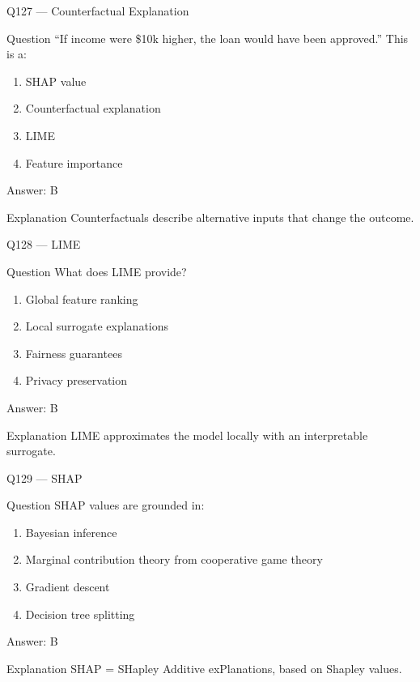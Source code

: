 \documentclass[aspectratio=169,8pt]{beamer}
\begin{document}
	\begin{frame}{Q127 --- Counterfactual Explanation}
		\begin{block}{Question}
			``If income were \$10k higher, the loan would have been approved.'' This is a:
		\end{block}
		\begin{enumerate}
			\item SHAP value
			\item Counterfactual explanation
			\item LIME
			\item Feature importance
		\end{enumerate}
		\begin{exampleblock}{Answer: B}\end{exampleblock}
		\begin{block}{Explanation}
			Counterfactuals describe alternative inputs that change the outcome.
		\end{block}
	\end{frame}
	
	\begin{frame}{Q128 --- LIME}
		\begin{block}{Question}
			What does LIME provide?
		\end{block}
		\begin{enumerate}
			\item Global feature ranking
			\item Local surrogate explanations
			\item Fairness guarantees
			\item Privacy preservation
		\end{enumerate}
		\begin{exampleblock}{Answer: B}\end{exampleblock}
		\begin{block}{Explanation}
			LIME approximates the model locally with an interpretable surrogate.
		\end{block}
	\end{frame}
	
	\begin{frame}{Q129 --- SHAP}
		\begin{block}{Question}
			SHAP values are grounded in:
		\end{block}
		\begin{enumerate}
			\item Bayesian inference
			\item Marginal contribution theory from cooperative game theory
			\item Gradient descent
			\item Decision tree splitting
		\end{enumerate}
		\begin{exampleblock}{Answer: B}\end{exampleblock}
		\begin{block}{Explanation}
			SHAP = SHapley Additive exPlanations, based on Shapley values.
		\end{block}
	\end{frame}
	
\end{document}
